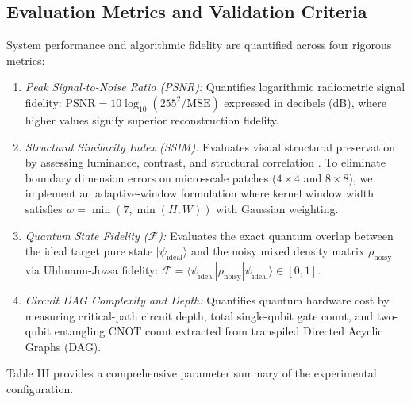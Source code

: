 \documentclass[12pt,onecolumn,draftclsnofoot]{IEEEtran}
\begin{document}
\subsection{Evaluation Metrics and Validation Criteria}
System performance and algorithmic fidelity are quantified across four rigorous metrics:
\begin{enumerate}
    \item \textit{Peak Signal-to-Noise Ratio (PSNR):} Quantifies logarithmic radiometric signal fidelity: $\text{PSNR} = 10 \log_{10}(255^2 / \text{MSE})$ expressed in decibels (dB), where higher values signify superior reconstruction fidelity.
    \item \textit{Structural Similarity Index (SSIM):} Evaluates visual structural preservation by assessing luminance, contrast, and structural correlation \cite{wang2004image}. To eliminate boundary dimension errors on micro-scale patches ($4 \times 4$ and $8 \times 8$), we implement an adaptive-window formulation where kernel window width satisfies $w = \min(7, \min(H, W))$ with Gaussian weighting.
    \item \textit{Quantum State Fidelity ($\mathcal{F}$):} Evaluates the exact quantum overlap between the ideal target pure state $|\psi_{\text{ideal}}\rangle$ and the noisy mixed density matrix $\rho_{\text{noisy}}$ via Uhlmann-Jozsa fidelity: $\mathcal{F} = \langle \psi_{\text{ideal}} | \rho_{\text{noisy}} | \psi_{\text{ideal}} \rangle \in [0, 1]$.
    \item \textit{Circuit DAG Complexity and Depth:} Quantifies quantum hardware cost by measuring critical-path circuit depth, total single-qubit gate count, and two-qubit entangling CNOT count extracted from transpiled Directed Acyclic Graphs (DAG).
\end{enumerate}

Table III provides a comprehensive parameter summary of the experimental configuration.
\end{document}
